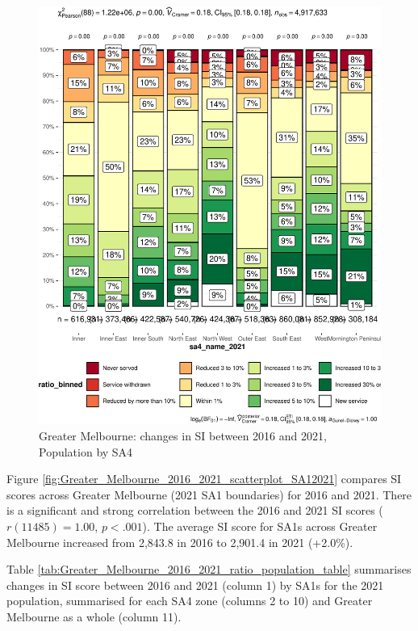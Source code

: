 \documentclass[preprint, 3p,
authoryear]{elsarticle} %
\begin{document}
\begin{figure}
\includegraphics[width=0.9\linewidth]{Leveraging_GTFS_to_assess_transit_supply_Transport_Geography_files/figure-latex/Greater_Melbourne_2016_2021_ratio_population_table-1} \caption{Greater Melbourne: changes in SI between 2016 and 2021, Population by SA4}\label{fig:Greater_Melbourne_2016_2021_ratio_population_table}
\end{figure}

Figure \ref{fig:Greater_Melbourne_2016_2021_scatterplot_SA12021}
compares SI scores across Greater Melbourne (2021 SA1 boundaries) for
2016 and 2021. There is a significant and strong correlation between the
2016 and 2021 SI scores (\(r(11485) = 1.00\), \(p < .001\)). The average
SI score for SA1s across Greater Melbourne increased from 2,843.8 in
2016 to 2,901.4 in 2021 (+2.0\%).

Table \ref{tab:Greater_Melbourne_2016_2021_ratio_population_table}
summarises changes in SI score between 2016 and 2021 (column 1) by SA1s
for the 2021 population, summarised for each SA4 zone (columns 2 to 10)
and Greater Melbourne as a whole (column 11).
\end{document}

